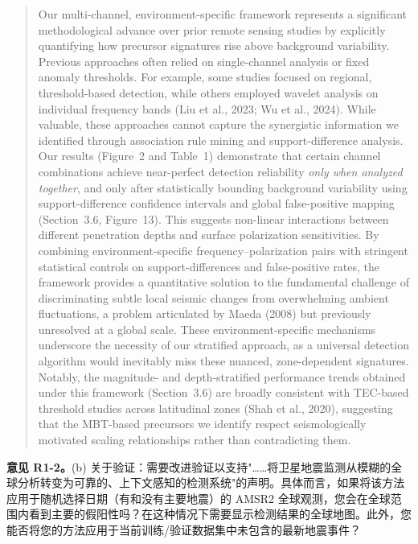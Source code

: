 \documentclass[12pt]{article}
\newcommand{\revcomment}[1]{\begingroup\color{commentcolor}#1\endgroup}
\begin{document}
{\begin{quote}
Our multi-channel, environment-specific framework represents a significant methodological advance over prior remote sensing studies by explicitly quantifying how precursor signatures rise above background variability. Previous approaches often relied on single-channel analysis or fixed anomaly thresholds. For example, some studies focused on regional, threshold-based detection, while others employed wavelet analysis on individual frequency bands (Liu et al., 2023; Wu et al., 2024). While valuable, these approaches cannot capture the synergistic information we identified through association rule mining and support-difference analysis. Our results (Figure~2 and Table~1) demonstrate that certain channel combinations achieve near-perfect detection reliability \emph{only when analyzed together}, and only after statistically bounding background variability using support-difference confidence intervals and global false-positive mapping (Section~3.6, Figure~13). This suggests non-linear interactions between different penetration depths and surface polarization sensitivities. By combining environment-specific frequency--polarization pairs with stringent statistical controls on support-differences and false-positive rates, the framework provides a quantitative solution to the fundamental challenge of discriminating subtle local seismic changes from overwhelming ambient fluctuations, a problem articulated by Maeda (2008) but previously unresolved at a global scale. These environment-specific mechanisms underscore the necessity of our stratified approach, as a universal detection algorithm would inevitably miss these nuanced, zone-dependent signatures. Notably, the magnitude- and depth-stratified performance trends obtained under this framework (Section~3.6) are broadly consistent with TEC-based threshold studies across latitudinal zones (Shah et al., 2020), suggesting that the MBT-based precursors we identify respect seismologically motivated scaling relationships rather than contradicting them.
\end{quote}
}

\bigskip

\revcomment{%
\textbf{意见 R1-2。}(b) 关于验证：需要改进验证以支持"……将卫星地震监测从模糊的全球分析转变为可靠的、上下文感知的检测系统"的声明。具体而言，如果将该方法应用于随机选择日期（有和没有主要地震）的 AMSR2 全球观测，您会在全球范围内看到主要的假阳性吗？在这种情况下需要显示检测结果的全球地图。此外，您能否将您的方法应用于当前训练/验证数据集中未包含的最新地震事件？
}
\end{document}
